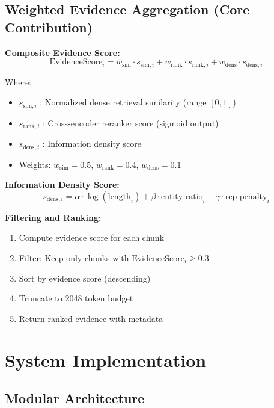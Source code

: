 \documentclass[twocolumn,11pt]{article}
\begin{document}
\subsection{Weighted Evidence Aggregation (Core Contribution)}

\textbf{Composite Evidence Score:}
\begin{equation}
\text{EvidenceScore}_i = w_{\text{sim}} \cdot s_{\text{sim},i} + w_{\text{rank}} \cdot s_{\text{rank},i} + w_{\text{dens}} \cdot s_{\text{dens},i}
\end{equation}

Where:
\begin{itemize}
\item $s_{\text{sim},i}$ : Normalized dense retrieval similarity (range $[0, 1]$)
\item $s_{\text{rank},i}$ : Cross-encoder reranker score (sigmoid output)
\item $s_{\text{dens},i}$ : Information density score
\item Weights: $w_{\text{sim}}=0.5$, $w_{\text{rank}}=0.4$, $w_{\text{dens}}=0.1$
\end{itemize}

\textbf{Information Density Score:}
\begin{equation}
s_{\text{dens},i} = \alpha \cdot \log(\text{length}_i) + \beta \cdot \text{entity\_ratio}_i - \gamma \cdot \text{rep\_penalty}_i
\end{equation}

\textbf{Filtering and Ranking:}
\begin{enumerate}
\item Compute evidence score for each chunk
\item Filter: Keep only chunks with $\text{EvidenceScore}_i \geq 0.3$
\item Sort by evidence score (descending)
\item Truncate to 2048 token budget
\item Return ranked evidence with metadata
\end{enumerate}

\section{System Implementation}

\subsection{Modular Architecture}
\end{document}
